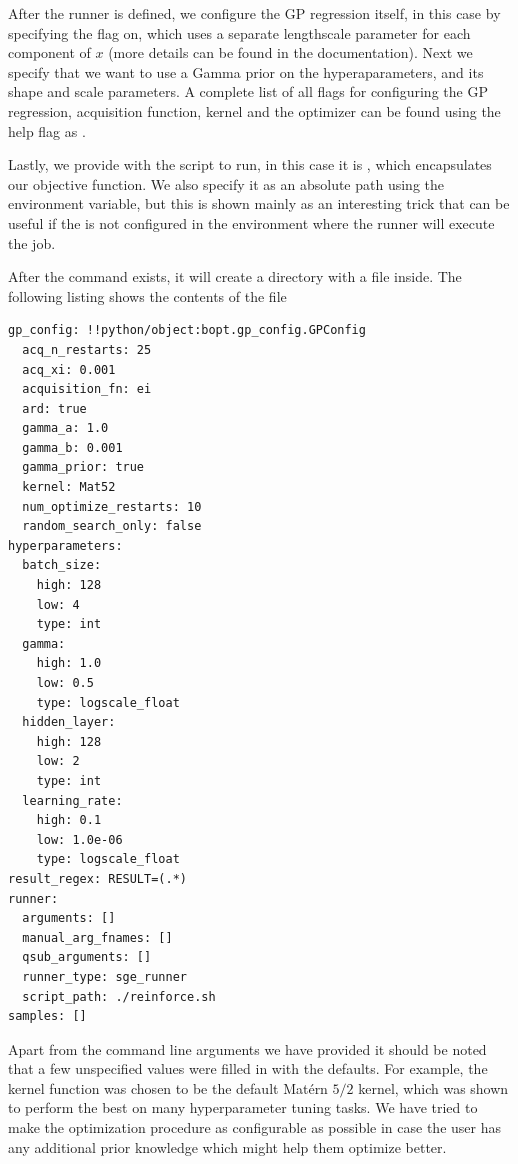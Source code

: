 After the runner is defined, we configure the GP regression itself, in this case by specifying the  flag on, which uses a separate lengthscale parameter for each component of $x$ (more details can be found in the \cite{gpy} documentation). Next we specify that we want to use a Gamma prior on the hyperaparameters, and its shape and scale parameters. A complete list of all flags for configuring the GP regression, acquisition function, kernel and the optimizer can be found using the help flag as .

Lastly, we provide \bopt with the script to run, in this case it is , which encapsulates our objective function. We also specify it as an absolute path using the  environment variable, but this is shown mainly as an interesting trick that can be useful if the  is not configured in the environment where the runner will execute the job.

After the command exists, it will create a directory  with a  file inside. The following listing shows the contents of the file

\begin{center}
\begin{verbatim}
gp_config: !!python/object:bopt.gp_config.GPConfig
  acq_n_restarts: 25
  acq_xi: 0.001
  acquisition_fn: ei
  ard: true
  gamma_a: 1.0
  gamma_b: 0.001
  gamma_prior: true
  kernel: Mat52
  num_optimize_restarts: 10
  random_search_only: false
hyperparameters:
  batch_size:
    high: 128
    low: 4
    type: int
  gamma:
    high: 1.0
    low: 0.5
    type: logscale_float
  hidden_layer:
    high: 128
    low: 2
    type: int
  learning_rate:
    high: 0.1
    low: 1.0e-06
    type: logscale_float
result_regex: RESULT=(.*)
runner:
  arguments: []
  manual_arg_fnames: []
  qsub_arguments: []
  runner_type: sge_runner
  script_path: ./reinforce.sh
samples: []
\end{verbatim}
\end{center}

Apart from the command line arguments we have provided it should be noted that a few unspecified values were filled in with the defaults. For example, the kernel function was chosen to be the default Mat\'ern $5/2$ kernel, which was shown \citep{snoek2012practical} to perform the best on many hyperparameter tuning tasks. We have tried to make the optimization procedure as configurable as possible in case the user has any additional prior knowledge which might help them optimize better.

